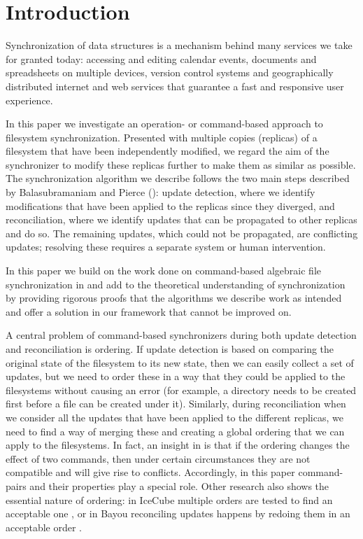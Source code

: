 
\section{Introduction}

Synchronization of data structures
is a mechanism behind many services we take for granted today:
accessing and editing calendar events, documents and spreadsheets
on multiple devices, version control systems and
geographically distributed internet and web services that
guarantee a fast and responsive user experience.

In this paper we investigate an operation- or command-based approach
to filesystem synchronization.
Presented with multiple copies (replicas) of a filesystem that have been independently modified,
we regard the aim of the synchronizer to modify these replicas further
to make them as similar as possible.
The synchronization algorithm we describe
follows the two main steps described by Balasubramaniam and Pierce (\cite{BP}):
update detection, where we identify modifications that have been applied to the replicas
since they diverged,
and reconciliation, where we identify updates that can be propagated to other replicas and do so.
The remaining updates, which could not be propagated, are conflicting updates;
resolving these requires a separate system or human intervention.

In this paper we build on the work done 
on command-based algebraic file synchronization
in \cite{NREC} and add to the theoretical understanding
of synchronization by providing rigorous proofs that the algorithms
we describe work as intended
and offer a solution in our framework that cannot be improved on.

A central problem of command-based synchronizers during both update detection and reconciliation
is ordering.
If update detection is based on comparing the original state of the filesystem
to its new state, then we can easily collect a set of updates,
but we need to order these in a way that they could be applied
to the filesystems
without causing an error 
(for example, a directory needs to be created first before a file can be created under it).
Similarly, during reconciliation when we consider all the updates that
have been applied to the different replicas, we need to find a way of
merging these and creating a global ordering that we can apply
to the filesystems.
In fact, an insight in \cite{NREC} is that
if the ordering changes the effect of two commands,
then under certain circumstances they are not compatible and will give rise to conflicts.
Accordingly, in this paper command-pairs and their properties
play a special role.
Other research also shows the essential nature of ordering:
in IceCube multiple orders are tested to find an acceptable one \cite{KRSD},
or in Bayou reconciling updates happens by redoing them in an acceptable order \cite{TTPDSH}.

